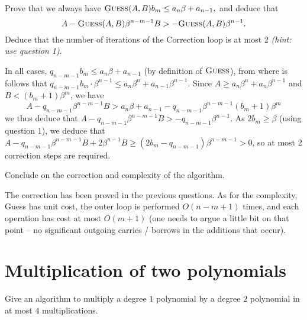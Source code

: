 \documentclass[11pt]{exam}
\theoremstyle{definition}
\begin{document}
\begin{questions}
\question Prove that we always have  $\textsc{Guess}(A,B) b_m \leq a_n \beta + a_{n-1},$
and deduce that \[A - \textsc{Guess}(A,B) \beta^{n-m-1} B > -\textsc{Guess}(A,B) \beta^{n-1}.\] Deduce that
the number of iterations of the Correction loop is at most 2 \textit{(hint: use question 1)}.

\begin{solution}
In all cases, $q_{n-m-1} b_m \leq a_n \beta + a_{n-1}$ (by definition of $\textsc{Guess}$), from where is follows that $q_{n-m-1} b_m \cdot \beta^{n-1} \leq a_n \beta^n + a_{n-1}\beta^{n-1}$. Since $A \geq a_n \beta^{n} + a_n \beta^{n-1}$ and $B < (b_m+1) \beta^m$, we have 
$$
A -  q_{n-m-1} \beta^{n-m-1} B > a_n \beta + a_{n-1} - q_{n-m-1} \beta^{n-m-1} (b_m + 1) \beta^m
$$ we thus deduce that
$A - q_{n-m-1} \beta^{n-m-1} B > -q_{n-m-1} \beta^{n-1} $. As $2b_m \geq \beta$ (using question 1), we deduce that $A - q_{n-m-1} \beta^{n-m-1} B + 2 \beta^{n-1} B
\geq (2 b_m - q_{n-m-1}) \beta^{n-m-1} > 0$, so at most 2 correction steps
are required.
\end{solution}
\bigskip

\question Conclude on the correction and complexity of the algorithm.



\begin{solution}
The correction has been proved in the previous questions. As
for the complexity, Guess has unit cost, the outer loop is performed
$O(n-m+1)$ times, and each operation has cost at most $O(m+1)$ (one needs
to argue a little bit on that point -- no significant outgoing carries /
borrows in the additions that occur).
\end{solution}
\end{questions}

\section{Multiplication of two polynomials}

Give an algorithm to multiply a degree $1$ polynomial by a degree $2$
polynomial in at most $4$ multiplications. %
\end{document}
